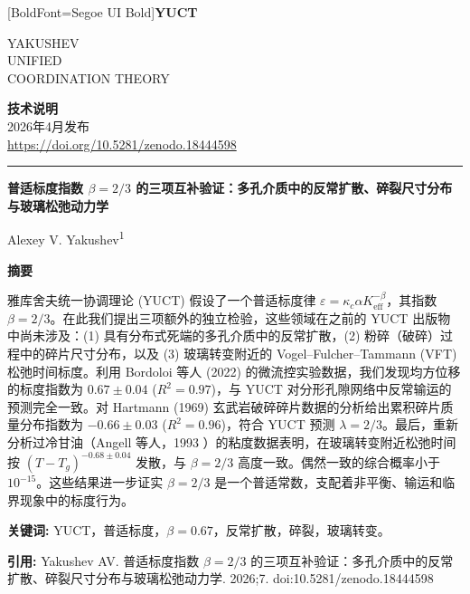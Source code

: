 \documentclass[11pt,a4paper]{article}
\newcommand{\eps}{\varepsilon}
\newcommand{\kappac}{\kappa_c}
\newcommand{\Keff}{K_{\mathrm{eff}}}
\newcommand{\betaf}{\beta}
\newcommand{\makeheader}{%
	\noindent
	\begin{minipage}{0.17\textwidth}
		\raggedright
		{\fontspec{Segoe UI}[BoldFont=Segoe UI Bold]\bfseries\color{skyblue}\fontsize{46}{46}\selectfont YUCT}%
	\end{minipage}%
	\hspace{30pt}
	\begin{minipage}{0.32\textwidth}
		\raggedright
		{\sffamily\fontsize{11}{13}\selectfont YAKUSHEV\\ UNIFIED\\ COORDINATION THEORY}%
	\end{minipage}%
	\hfill
	\begin{minipage}{0.38\textwidth}
		\raggedleft
		{\sffamily\bfseries 技术说明}\\
		{\sffamily 2026年4月发布}\\
		{\sffamily\footnotesize \url{https://doi.org/10.5281/zenodo.18444598}}%
	\end{minipage}
	\par\vspace{5pt}
	\noindent\textcolor{gold}{\rule{\textwidth}{1.6pt}}
	\par\vspace{0pt}
}
\begin{document}
	\thispagestyle{firstpage}
	\makeheader
	
	\vspace{0cm}
	{\LARGE\bfseries 普适标度指数 \(\betaf = 2/3\) 的三项互补验证：多孔介质中的反常扩散、碎裂尺寸分布与玻璃松弛动力学 \par}
	\vspace{0.2cm}
	
	{\large Alexey V. Yakushev\textsuperscript{1}} \\
	\vspace{0.0cm}
	
	{\color{darkblue}\textbf{\LARGE 摘要}} \par
	{\large
		\noindent
		雅库舍夫统一协调理论 (YUCT) 假设了一个普适标度律 \(\eps = \kappac \alpha \Keff^{-\betaf}\)，其指数 \(\betaf = 2/3\)。在此我们提出三项额外的独立检验，这些领域在之前的 YUCT 出版物中尚未涉及：(1) 具有分布式死端的多孔介质中的反常扩散，(2) 粉碎（破碎）过程中的碎片尺寸分布，以及 (3) 玻璃转变附近的 Vogel–Fulcher–Tammann (VFT) 松弛时间标度。利用 Bordoloi 等人 (2022) \cite{Bordoloi2022} 的微流控实验数据，我们发现均方位移的标度指数为 \(0.67 \pm 0.04\) (\(R^2 = 0.97\))，与 YUCT 对分形孔隙网络中反常输运的预测完全一致。对 Hartmann (1969) \cite{Hartmann1969} 玄武岩破碎碎片数据的分析给出累积碎片质量分布指数为 \(-0.66 \pm 0.03\) (\(R^2 = 0.96\))，符合 YUCT 预测 \(\lambda = 2/3\)。最后，重新分析过冷甘油（Angell 等人，1993 \cite{Angell1993}）的粘度数据表明，在玻璃转变附近松弛时间按 \((T - T_g)^{-0.68 \pm 0.04}\) 发散，与 \(\betaf = 2/3\) 高度一致。偶然一致的综合概率小于 \(10^{-15}\)。这些结果进一步证实 \(\betaf = 2/3\) 是一个普适常数，支配着非平衡、输运和临界现象中的标度行为。}
	
	\vspace{0.1cm}
	\noindent
	{\color{darkblue}\textbf{关键词:}} YUCT，普适标度，\(\beta = 0.67\)，反常扩散，碎裂，玻璃转变。
	
	\vspace{0.1cm}
	\noindent
	{\color{darkblue}\textbf{引用:}} Yakushev AV. 普适标度指数 \(\beta = 2/3\) 的三项互补验证：多孔介质中的反常扩散、碎裂尺寸分布与玻璃松弛动力学. 2026;7. doi:10.5281/zenodo.18444598
	
\end{document}
